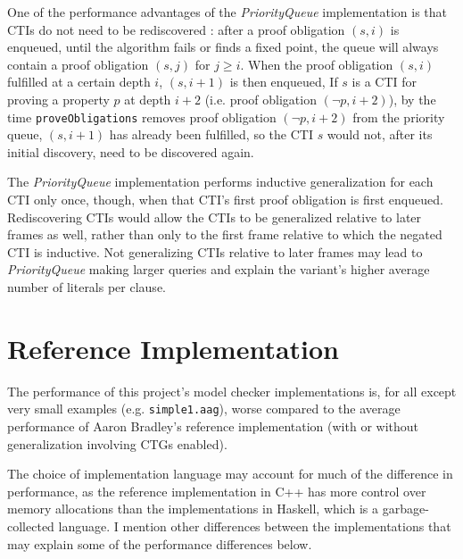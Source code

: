 \documentclass[12pt,a4paper,twoside,openright]{report}
\begin{document}
{{One of the performance advantages of the \emph{PriorityQueue} implementation is that CTIs do not need
to be rediscovered \cite{een11}: after a proof obligation $(s,i)$ is enqueued, until the algorithm fails or finds a fixed point,
the queue will always contain a proof obligation $(s,j)$ for $j \geq i$. When the proof obligation $(s,i)$
fulfilled at a certain depth $i$, $(s,i + 1)$ is then enqueued, If $s$ is a CTI for proving a property
$p$ at depth $i + 2$ (i.e. proof obligation $(\neg p, i + 2)$), by the time \verb,proveObligations, removes
proof obligation $(\neg p, i + 2)$ from the priority queue, $(s, i+1)$ has already been fulfilled, so the
CTI $s$ would not, after its initial discovery, need to be discovered again.


The \emph{PriorityQueue} implementation performs inductive generalization for each CTI only once, though,
when that CTI's first proof obligation is first enqueued. Rediscovering CTIs would allow the CTIs to
be generalized relative to later frames as well, rather than only to the first frame relative to which
the negated CTI is inductive. Not generalizing CTIs relative to later frames may lead to
\emph{PriorityQueue} making larger queries and explain the variant's higher average number of
literals per clause.
}

\section{Reference Implementation}

The performance of this project's model checker implementations is, for all except very small examples
(e.g. \verb,simple1.aag,),
worse compared to the average performance of Aaron Bradley's reference implementation
(with or without generalization involving CTGs enabled).

The choice of implementation language may account for much of the difference in performance, as the reference
implementation in C++ has more control over memory allocations than the implementations in Haskell, which is
a garbage-collected language. I mention other differences between the implementations that may explain
some of the performance differences below.

}
\end{document}
